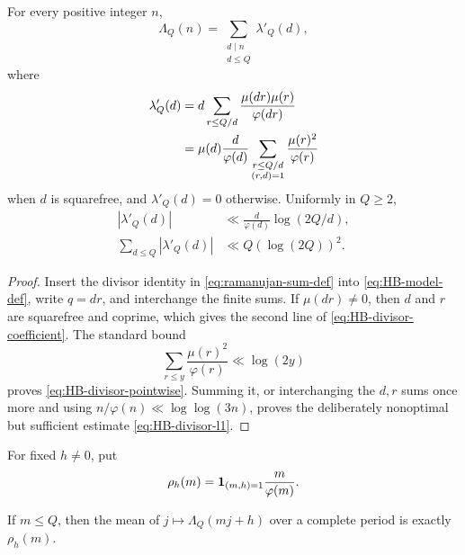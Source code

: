 \begin{lemma}
\label{lem:HB-divisor-expansion}
For every positive integer $n$,
\begin{equation}
 \Lambda_Q(n)=\sum_{\substack{d\mid n\\d\leq Q}}\lambda'_Q(d),
 \label{eq:HB-divisor-expansion}
\end{equation}
where
\begin{align}
 \lambda'_Q(d)
 &=d\sum_{r\leq Q/d}
 \frac{\mu(dr)\mu(r)}{\varphi(dr)}
 \notag\\
 &=\mu(d)\frac d{\varphi(d)}
 \sum_{\substack{r\leq Q/d\\(r,d)=1}}
 \frac{\mu(r)^2}{\varphi(r)}
 \label{eq:HB-divisor-coefficient}
\end{align}
when $d$ is squarefree, and $\lambda'_Q(d)=0$ otherwise.  Uniformly in
$Q\geq2$,
\begin{align}
 |\lambda'_Q(d)|&\ll
 \frac d{\varphi(d)}\log(2Q/d),
 \label{eq:HB-divisor-pointwise}\\
 \sum_{d\leq Q}|\lambda'_Q(d)|&\ll Q(\log(2Q))^2.
 \label{eq:HB-divisor-l1}
\end{align}
\end{lemma}

\begin{proof}
Insert the divisor identity in \eqref{eq:ramanujan-sum-def} into
\eqref{eq:HB-model-def}, write $q=dr$, and interchange the finite sums.
If $\mu(dr)\ne0$, then $d$ and $r$ are squarefree and coprime, which gives
the second line of \eqref{eq:HB-divisor-coefficient}.  The standard bound
\[
 \sum_{r\leq y}\frac{\mu(r)^2}{\varphi(r)}\ll\log(2y)
\]
proves \eqref{eq:HB-divisor-pointwise}.  Summing it, or interchanging the
$d,r$ sums once more and using $n/\varphi(n)\ll\log\log(3n)$, proves the
deliberately nonoptimal but sufficient estimate
\eqref{eq:HB-divisor-l1}.
\end{proof}

For fixed $h\ne0$, put
\begin{equation}
 \rho_h(m)=\mathbf 1_{(m,h)=1}\frac m{\varphi(m)}.
 \label{eq:ramanujan-row-density}
\end{equation}

\begin{lemma}
\label{lem:HB-complete-row-mean}
If $m\leq Q$, then the mean of $j\mapsto\Lambda_Q(mj+h)$ over a complete
period is exactly $\rho_h(m)$.
\end{lemma}

